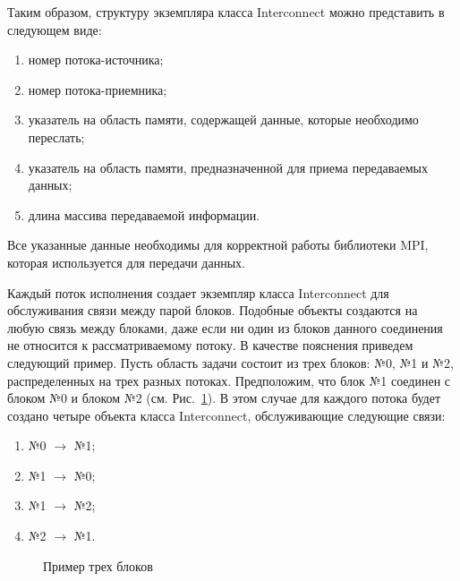 \documentclass[a4paper, 14pt]{extarticle}
\theoremstyle{definition}
\begin{document}
\par Таким образом, структуру экземпляра класса Interconnect можно представить в следующем виде:
\begin{enumerate}
\item[1)] номер потока-источника;
\item[2)] номер потока-приемника;
\item[3)] указатель на область памяти, содержащей данные, которые необходимо переслать;
\item[4)] указатель на область памяти, предназначенной для приема передаваемых данных;
\item[5)] длина массива передаваемой информации.
\end{enumerate}

\par Все указанные данные необходимы для корректной работы библиотеки MPI, которая используется для передачи данных.

\par Каждый поток исполнения создает экземпляр класса Interconnect для обслуживания связи между парой блоков. Подобные объекты создаются на любую связь между блоками, даже если ни один из блоков данного соединения не относится к рассматриваемому потоку. В качестве пояснения приведем следующий пример. Пусть область задачи состоит из трех блоков: №0, №1 и №2, распределенных на трех разных потоках. Предположим, что блок №1 соединен с блоком №0 и блоком №2 (см. Рис.~\ref{ris:3Block_ex}). В этом случае для каждого потока будет создано четыре объекта класса Interconnect, обслуживающие следующие связи:
\begin{enumerate}
\item[1)] {№0 $\to$ №1};
\item[2)] {№1 $\to$ №0};
\item[3)] {№1 $\to$ №2};
\item[4)] {№2 $\to$ №1}.
\end{enumerate}

\begin{figure}[h]
	\caption{Пример трех блоков}
	\label{ris:3Block_ex}
\end{figure}
\end{document}
